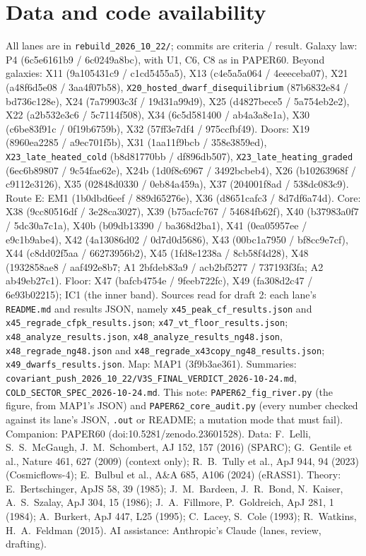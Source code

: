 \documentclass[10pt]{article}
\begin{document}
\section{Data and code availability}
{\footnotesize
All lanes are in \texttt{rebuild\_2026\_10\_22/}; commits are criteria / result. Galaxy law: P4 (6c5e6161b9 / 6c0249a8bc), with U1, C6, C8 as in PAPER60. Beyond galaxies: X11 (9a105431c9 / c1cd5455a5), X13 (c4e5a5a064 / 4eeeceba07), X21 (a48f6d5e08 / 3aa4f07b58), \texttt{X20\_hosted\_dwarf\_disequilibrium} (87b6832e84 / bd736c128e), X24 (7a79903c3f / 19d31a99d9), X25 (d4827bece5 / 5a754eb2e2), X22 (a2b532e3c6 / 5c7114f508), X34 (6c5d581400 / ab4a3a8e1a), X30 (c6be83f91c / 0f19b6759b), X32 (57ff3e7df4 / 975ccfbf49). Doors: X19 (8960ea2285 / a9ec701f5b), X31 (1aa11f9bcb / 358e3859ed), \texttt{X23\_late\_heated\_cold} (b8d81770bb / df896db507), \texttt{X23\_late\_heating\_graded} (6ec6b89807 / 9c54fae62e), X24b (1d0f8c6967 / 3492bcbeb4), X26 (b10263968f / c9112e3126), X35 (02848d0330 / 0eb84a459a), X37 (204001f8ad / 538dc083c9). Route E: EM1 (1b0dbd6eef / 889d65276e), X36 (d8651cafc3 / 8d7df6a74d). Core: X38 (9cc80516df / 3e28ca3027), X39 (b75acfc767 / 54684fb62f), X40 (b37983a0f7 / 5dc30a7c1a), X40b (b09db13390 / ba368d2ba1), X41 (0ea05957ee / e9c1b9abe4), X42 (4a13086d02 / 0d7d0d5686), X43 (00bc1a7950 / bf8cc9e7cf), X44 (c8dd02f5aa / 66273956b2), X45 (1fd8e1238a / 8cb58f4d28), X48 (1932858ae8 / aaf492e8b7; A1 2bfdeb83a9 / acb2bf5277 / 737193f3fa; A2 ab49eb27c1). Floor: X47 (bafcb4754e / 9feeb722fc), X49 (fa308d2c47 / 6e93b02215); IC1 (the inner band). Sources read for draft 2: each lane's \texttt{README.md} and results JSON, namely \texttt{x45\_peak\_cf\_results.json} and \texttt{x45\_regrade\_cfpk\_results.json}; \texttt{x47\_vt\_floor\_results.json}; \texttt{x48\_analyze\_results.json}, \texttt{x48\_analyze\_results\_ng48.json}, \texttt{x48\_regrade\_ng48.json} and \texttt{x48\_regrade\_x43copy\_ng48\_results.json}; \texttt{x49\_dwarfs\_results.json}. Map: MAP1 (3f9b3ae361). Summaries: \texttt{covariant\_push\_2026\_10\_22/V3S\_FINAL\_VERDICT\_2026-10-24.md}, \texttt{COLD\_SECTOR\_SPEC\_2026-10-24.md}. This note: \texttt{PAPER62\_fig\_river.py} (the figure, from MAP1's JSON) and \texttt{PAPER62\_core\_audit.py} (every number checked against its lane's JSON, \texttt{.out} or README; a mutation mode that must fail). Companion: PAPER60 (doi:10.5281/zenodo.23601528).
Data: F.~Lelli, S.~S.~McGaugh, J.~M.~Schombert, AJ 152, 157 (2016) (SPARC); G.~Gentile et al., Nature 461, 627 (2009) (context only); R.~B.~Tully et al., ApJ 944, 94 (2023) (Cosmicflows-4); E.~Bulbul et al., A\&A 685, A106 (2024) (eRASS1).
Theory: E.~Bertschinger, ApJS 58, 39 (1985); J.~M.~Bardeen, J.~R.~Bond, N.~Kaiser, A.~S.~Szalay, ApJ 304, 15 (1986); J.~A.~Fillmore, P.~Goldreich, ApJ 281, 1 (1984); A.~Burkert, ApJ 447, L25 (1995); C.~Lacey, S.~Cole (1993); R.~Watkins, H.~A.~Feldman (2015).
AI assistance: Anthropic's Claude (lanes, review, drafting).}
\end{document}
